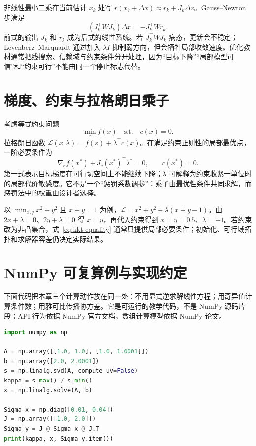 非线性最小二乘在当前估计 $x_k$ 处写 $r(x_k+\Delta x)\approx r_k+J_k\Delta x$。Gauss--Newton 步满足
\begin{equation}
(J_k^\top WJ_k)\Delta x=-J_k^\top Wr_k.
\label{eq:gauss-newton}
\end{equation}
前式的输出 $J_k$ 和 $r_k$ 成为后式的线性系统。若 $J_k^\top WJ_k$ 病态，更新会不稳定；Levenberg--Marquardt 通过加入 $\lambda I$ 抑制弱方向，但会牺牲局部收敛速度。优化教材通常把线搜索、信赖域与约束条件分开处理，因为“目标下降”“局部模型可信”和“约束可行”不能由同一个停止标志代替\cite{nocedal2006numerical}。

\section{梯度、约束与拉格朗日乘子}

考虑等式约束问题
\begin{equation}
\min_x f(x)\quad\text{s.t.}\quad c(x)=0.
\label{eq:equality-constrained-problem}
\end{equation}
拉格朗日函数 $\mathcal{L}(x,\lambda)=f(x)+\lambda^\top c(x)$。在满足约束正则性的局部最优点，一阶必要条件为
\begin{equation}
\nabla_x f(x^*)+J_c(x^*)^\top\lambda^*=0,
\qquad c(x^*)=0.
\label{eq:kkt-equality}
\end{equation}
第一式表示目标梯度在可行切空间上不能继续下降；$\lambda$ 可解释为约束收紧一单位时的局部代价敏感度。它不是一个“惩罚系数调参”：乘子由最优性条件共同求解，而惩罚法中的权重由设计者选择。

以 $\min_{x,y}x^2+y^2$ 且 $x+y=1$ 为例，$\mathcal{L}=x^2+y^2+\lambda(x+y-1)$。由 $2x+\lambda=0$、$2y+\lambda=0$ 得 $x=y$，再代入约束得到 $x=y=0.5$、$\lambda=-1$。若约束改为非凸集合，式~\eqref{eq:kkt-equality} 通常只提供局部必要条件；初始化、可行域拓扑和求解器容差仍决定实际结果。

\section{NumPy 可复算例与实现约定}

下面代码把本章三个计算动作放在同一处：不用显式逆求解线性方程；用奇异值计算条件数；用雅可比传播协方差。它是可运行的教学代码，不是 NumPy 源码片段；API 行为依据 NumPy 官方文档，数组计算模型依据 NumPy 论文\cite{harris2020numpy,numpy_linalg_docs}。

\begin{lstlisting}[language=Python,caption={条件数、线性求解与一阶协方差传播的 NumPy 教学代码},label={lst:ch04-numpy}]
import numpy as np

A = np.array([[1.0, 1.0], [1.0, 1.0001]])
b = np.array([2.0, 2.0001])
s = np.linalg.svd(A, compute_uv=False)
kappa = s.max() / s.min()
x = np.linalg.solve(A, b)

Sigma_x = np.diag([0.01, 0.04])
J = np.array([[1.0, 2.0]])
Sigma_y = J @ Sigma_x @ J.T
print(kappa, x, Sigma_y.item())
\end{lstlisting}

